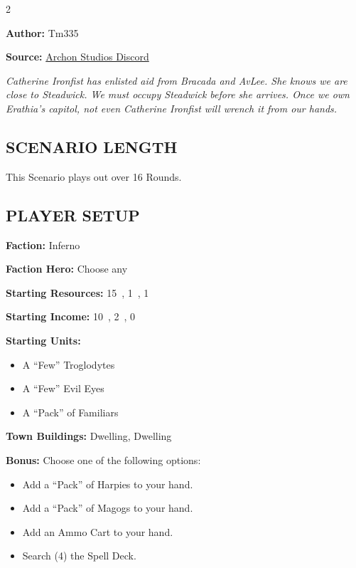 
\begin{multicols*}{2}

\textbf{Author:} Tm335

\textbf{Source:} \href{https://discord.com/channels/740870068178649108/1246353361456861276/1246353361456861276}{Archon Studios Discord}

\textit{Catherine Ironfist has enlisted aid from Bracada and AvLee.
She knows we are close to Steadwick.
We must occupy Steadwick before she arrives.
Once we own Erathia's capitol, not even Catherine Ironfist will wrench it from our hands.}

\subsection*{\MakeUppercase{Scenario Length}}

This Scenario plays out over 16 Rounds.

\subsection*{\MakeUppercase{Player Setup}}

\textbf{Faction:} Inferno

\textbf{Faction Hero:} Choose any

\textbf{Starting Resources:} 15~, 1~, 1~

\textbf{Starting Income:} 10~, 2~, 0~

\textbf{Starting Units:}

\begin{itemize}
  \item A ``Few'' Troglodytes
  \item A ``Few'' Evil Eyes
  \item A ``Pack'' of Familiars
\end{itemize}

\textbf{Town Buildings:}  Dwelling,  Dwelling

\textbf{Bonus:} Choose one of the following options:
\begin{itemize}
  \item Add a ``Pack'' of Harpies to your hand.
  \item Add a ``Pack'' of Magogs to your hand.
  \item Add an Ammo Cart to your hand.
  \item Search (4) the Spell Deck.
\end{itemize}


\end{multicols*}
